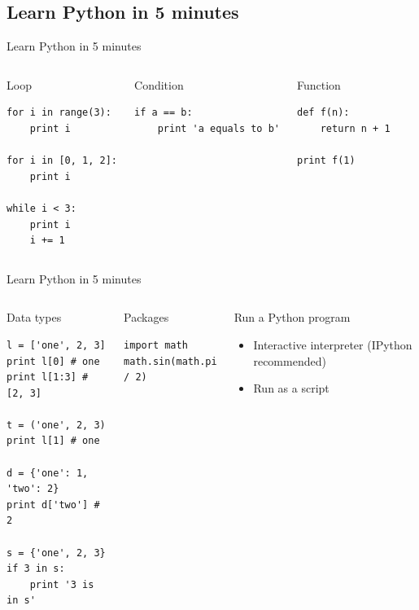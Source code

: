 \documentclass{beamer}
\begin{document}
\subsection{Learn Python in 5 minutes}
\begin{frame}[fragile]{Learn Python in 5 minutes}\pause
\begin{columns}
\begin{block}{Loop}
\begin{verbatim}
for i in range(3):
    print i

for i in [0, 1, 2]:
    print i

while i < 3:
    print i
    i += 1
\end{verbatim}
\end{block}
\pause
{}
\begin{block}{Condition}
\begin{verbatim}
if a == b:
    print 'a equals to b'
\end{verbatim}
\end{block}
\pause
\begin{block}{Function}
\begin{verbatim}
def f(n):
    return n + 1

print f(1)
\end{verbatim}
\end{block}

\end{columns}
\end{frame}

\begin{frame}[fragile]{Learn Python in 5 minutes}
\begin{columns}
\begin{block}{Data types}
\begin{verbatim}
l = ['one', 2, 3]
print l[0] # one
print l[1:3] # [2, 3]

t = ('one', 2, 3)
print l[1] # one

d = {'one': 1, 'two': 2}
print d['two'] # 2

s = {'one', 2, 3}
if 3 in s:
    print '3 is in s'
\end{verbatim}
\end{block}
\pause
{}
\begin{block}{Packages}
\begin{verbatim}
import math
math.sin(math.pi / 2)
\end{verbatim}
\end{block}
\pause
\begin{block}{Run a Python program}
\begin{itemize}
 \item Interactive interpreter\newline
 (IPython recommended)
 \item Run as a script
\end{itemize}
\end{block}
\end{columns}
\end{frame}
\end{document}
